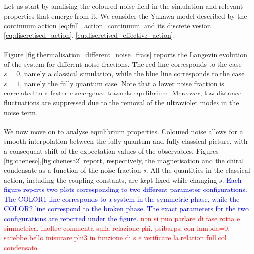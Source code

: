 Let us start by analising the coloured noise field in the simulation and relevant properties that emerge from it. We consider the Yukawa model described by the continuum action \eqref{eq:full_action_continuum} and its discrete vesion \eqref{eq:discretised_action}, \eqref{eq:discretised_effective_action}. \\~\\
Figure \ref{fig:thermalisation_different_noise_fracs} reports the Langevin evolution of the system for different noise fractions. The red line corresponds to the case $s=0$, namely a classical simulation, while the blue line corresponds to the case $s=1$, namely the fully quantum case. 
Note that a lower noise fraction is correlated to a faster convergence towards equilibrium. Moreover, low-distance fluctuations are suppressed due to the removal of the ultraviolet modes in the noise term. \\~\\
We now move on to analyse equilibrium properties. Coloured noise allows for a smooth interpolation between the fully quantum and fully classical picture, with a consequent shift of the expectation values of the observables. Figures \ref{fig:cheneso},\ref{fig:cheneso2} report, respectively, the magnetisation and the chiral condensate as a function of the noise fraction $s$. All the quantities in the classical action, including the coupling constants, are kept fixed while changing $s$.
\textcolor{blue}{Each figure reports two plots corresponding to two different parameter configurations. The COLOR1 line corresponds to a system in the symmetric phase, while the COLOR2 line correspond to the broken phase. The exact parameters for the two configurations are reported under the figure.}
\textcolor{red}{non si puo parlare di fase rotta e simmetrica. inoltre commenta sulla relazione phi, psibarpsi con lambda=0. sarebbe bello misurare phi3 in funzione di s e verificare la relation full col condensato}.
